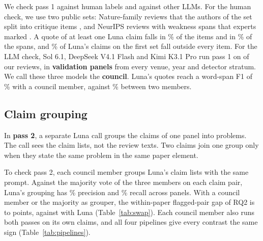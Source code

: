 \documentclass[11pt]{article}
\begin{document}
We check pass 1 against human labels and against other LLMs. For the human check, we use two public sets: \KimReviews{} Nature-family reviews that the authors of the set split into \KimItems{} critique items \citep{kim2026limits}, and \ClaimcheckReviews{} NeurIPS reviews with \ClaimcheckItems{} weakness spans that experts marked \citep{ou2025claimcheck}. A quote of at least one Luna claim falls in \KimItemRecall\% of the items and in \ClaimcheckItemRecall\% of the spans, and \KimClaimUnmatched\% of Luna's claims on the first set fall outside every item. For the LLM check, Sol 6.1, DeepSeek V4.1 Flash and Kimi K3.1 Pro run pass 1 on \RefReviews{} of our reviews, in \RefPanels{} \textbf{validation panels} from every venue, year and detector stratum. We call these three models the \textbf{council}. Luna's quotes reach a word-span F1 of \RefSpanFOne\% with a council member, against \RefCouncilSpanFOne\% between two members.

\subsection{Claim grouping}
\label{sec:grouping}
In \textbf{pass 2}, a separate Luna call groups the claims of one panel into problems. The call sees the claim lists, not the review texts. Two claims join one group only when they state the same problem in the same paper element.

To check pass 2, each council member groups Luna's claim lists with the same prompt. Against the majority vote of the three members on each claim pair, Luna's grouping has \RefPairPrecision\% precision and \RefPairRecall\% recall across \RefPairPanels{} panels. With a council member or the majority as grouper, the within-paper flagged-pair gap of RQ2 is \RefSwapFlagMin{} to \RefSwapFlagMax{} points, against \RefSwapFlagLuna{} with Luna (Table~\ref{tab:swap}). Each council member also runs both passes on its own claims, and all four pipelines give every contrast the same sign (Table~\ref{tab:pipelines}).

\begin{table}[t]
\centering\footnotesize

\caption{Every grouper gives about the same within-paper gaps. Each grouper groups Luna's claims on \RefSwapPanels{} validation panels from 2024 on. Gap: overlap of pairs with one or two flagged reviews minus unflagged pairs of the same paper, with 95\% intervals.}
\label{tab:swap}
\end{table}

\begin{table}[t]
\centering\footnotesize
\setlength{\tabcolsep}{3pt}

\caption{All four pipelines give every contrast the same sign; the overlap level depends on the model. Each model extracts and groups its own claims on \RefPipePanels{} same-paper and \RefCrossPanels{} cross-paper validation panels. Flagged gap: the two-flagged gap of Table~\ref{tab:swap}.}
\label{tab:pipelines}
\end{table}
\end{document}
